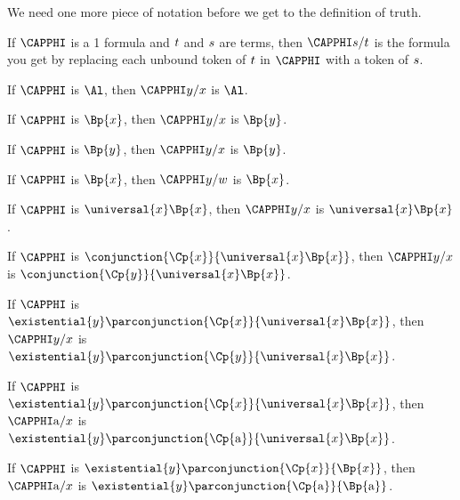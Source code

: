 We need one more piece of notation before we get to the definition of truth.
\begin{majorILnc}{}
	If $\CAPPHI$ is a \GQL{}1 formula and $t$ and $s$ are terms, then $\CAPPHI\variable{s}/\variable{t}$ is the formula you get by replacing each unbound token of $t$ in $\CAPPHI$ with a token of $s$.
\end{majorILnc}

\begin{majorILnc}{}
	\begin{cenumerate}
		\item If $\CAPPHI$ is $\Al$, then $\CAPPHI\variable{y}/\variable{x}$ is $\Al$.
		\item If $\CAPPHI$ is $\Bp{\variable{x}}$, then $\CAPPHI\variable{y}/\variable{x}$ is $\Bp{\variable{y}}$.
		\item If $\CAPPHI$ is $\Bp{\variable{y}}$, then $\CAPPHI\variable{y}/\variable{x}$ is $\Bp{\variable{y}}$.
		\item If $\CAPPHI$ is $\Bp{\variable{x}}$, then $\CAPPHI\variable{y}/\variable{w}$ is $\Bp{\variable{x}}$.
		\item If $\CAPPHI$ is $\universal{x}\Bp{\variable{x}}$, then $\CAPPHI\variable{y}/\variable{x}$ is $\universal{x}\Bp{\variable{x}}$.
		\item If $\CAPPHI$ is $\conjunction{\Cp{\variable{x}}}{\universal{x}\Bp{\variable{x}}}$, then $\CAPPHI\variable{y}/\variable{x}$ is $\conjunction{\Cp{\variable{y}}}{\universal{x}\Bp{\variable{x}}}$.
		\item If $\CAPPHI$ is $\existential{\variable{y}}\parconjunction{\Cp{\variable{x}}}{\universal{x}\Bp{\variable{x}}}$, then $\CAPPHI\variable{y}/\variable{x}$ is $\existential{\variable{y}}\parconjunction{\Cp{\variable{y}}}{\universal{x}\Bp{\variable{x}}}$.
		\item If $\CAPPHI$ is $\existential{\variable{y}}\parconjunction{\Cp{\variable{x}}}{\universal{x}\Bp{\variable{x}}}$, then $\CAPPHI\constant{a}/\variable{x}$ is $\existential{\variable{y}}\parconjunction{\Cp{\constant{a}}}{\universal{x}\Bp{\variable{x}}}$.
		\item If $\CAPPHI$ is $\existential{\variable{y}}\parconjunction{\Cp{\variable{x}}}{\Bp{\variable{x}}}$, then $\CAPPHI\constant{a}/\variable{x}$ is $\existential{\variable{y}}\parconjunction{\Cp{\constant{a}}}{\Bp{\constant{a}}}$.
	\end{cenumerate}
\end{majorILnc}

